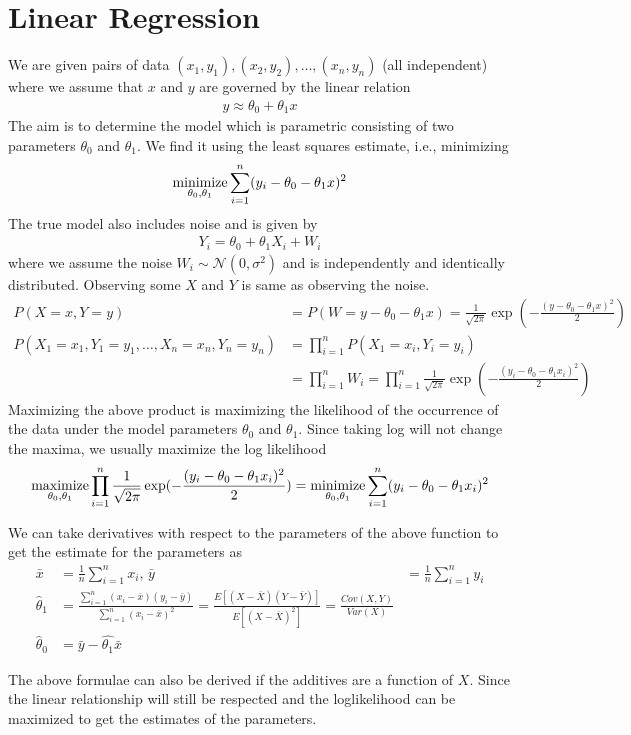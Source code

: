 \documentclass[../probability-notes.tex]{subfiles}
\begin{document}
    \section{Linear Regression}
    We are given pairs of data $(x_{1},y_{1}), (x_{2},y_{2}), \ldots, (x_{n},y_{n})$ (all independent) where we assume that $x$ and $y$ are governed by the linear relation
    \begin{align*}
        y \approx \theta_{0} + \theta_{1}x
    \end{align*}
    The aim is to determine the model which is parametric consisting of two parameters $\theta_{0}$ and $\theta_{1}$. We find it using the least squares estimate, i.e., minimizing
    \begin{align*}
        \operatorname*{minimize}_{\theta_{0}, \theta_{1}} \sum_{i=1}^{n} (y_{i} - \theta_{0} - \theta_{1}x)^{2}
    \end{align*}
    The true model also includes noise and is given by
    \begin{align*}
        Y_{i} = \theta_{0} + \theta_{1}X_{i} + W_{i}
    \end{align*}
    where we assume the noise $W_{i} \sim \mathcal{N}(0, \sigma^{2})$ and is independently and identically distributed. Observing some $X$ and $Y$ is same as observing the noise.
    \begin{align*}
        P(X=x,Y=y) &= P(W=y-\theta_{0}-\theta_{1}x) = \frac{1}{\sqrt{2\pi}} \exp(-\frac{(y-\theta_{0}-\theta_{1}x)^{2}}{2})\\
        P(X_{1}=x_{1},Y_{1}=y_{1}, \ldots, X_{n}=x_{n},Y_{n}=y_{n}) &= \prod_{i=1}^{n} P(X_{1}=x_{i},Y_{i}=y_{i})\\
        &= \prod_{i=1}^{n} W_{i} = \prod_{i=1}^{n} \frac{1}{\sqrt{2\pi}} \exp(-\frac{(y_{i}-\theta_{0}-\theta_{1}x_{i})^{2}}{2})
    \end{align*}
    Maximizing the above product is maximizing the likelihood of the occurrence of the data under the model parameters $\theta_{0}$ and $\theta_{1}$. Since taking log will not change the maxima, we usually maximize the log likelihood
    \begin{align*}
        \operatorname*{maximize}_{\theta_{0}, \theta_{1}} \prod_{i=1}^{n} \frac{1}{\sqrt{2\pi}} \exp(-\frac{(y_{i}-\theta_{0}-\theta_{1}x_{i})^{2}}{2}) = \operatorname*{minimize}_{\theta_{0}, \theta_{1}} \sum_{i=1}^{n} (y_{i}-\theta_{0}-\theta_{1}x_{i})^{2}
    \end{align*}

    We can take derivatives with respect to the parameters of the above function to get the estimate for the parameters as
    \begin{align*}
        \bar{x} &= \frac{1}{n} \sum_{i=1}^{n} x_{i} \text{, } \bar{y} &= \frac{1}{n} \sum_{i=1}^{n} y_{i}\\
        \hat{\theta}_{1} &= \frac{\sum_{i=1}^{n} (x_{i} - \bar{x}) (y_{i} - \bar{y})}{\sum_{i=1}^{n}(x_{i} - \bar{x})^{2}} = \frac{E[(X-\bar{X})(Y-\bar{Y})]}{E[(X-\bar{X})^{2}]} = \frac{Cov(X,Y)}{Var(X)}\\
        \hat{\theta}_{0} &= \bar{y} - \hat{\theta_{1}} \bar{x}
    \end{align*}

    The above formulae can also be derived if the additives are a function of $X$. Since the linear relationship will still be respected and the loglikelihood can be maximized to get the estimates of the parameters.
\end{document}
